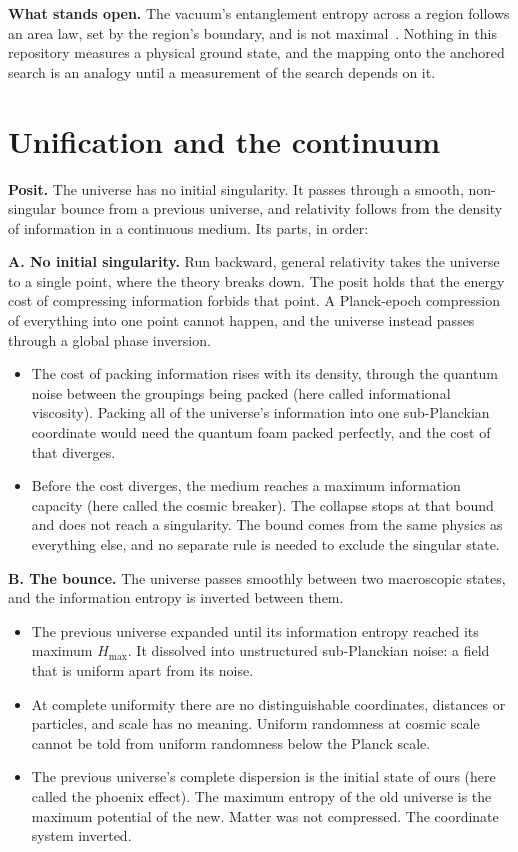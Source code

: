 \textbf{What stands open.} The vacuum's entanglement entropy across a region follows an area law, set
by the region's boundary, and is not maximal~\cite{src:Srednicki-1993}. Nothing in this repository
measures a physical ground state, and the mapping onto the anchored search is an analogy until a
measurement of the search depends on it.

\section{Unification and the continuum}

\textbf{Posit.} The universe has no initial singularity. It passes through a smooth, non-singular
bounce from a previous universe, and relativity follows from the density of information in a
continuous medium. Its parts, in order:

\textbf{A. No initial singularity.} Run backward, general relativity takes the universe to a single
point, where the theory breaks down. The posit holds that the energy cost of compressing information
forbids that point. A Planck-epoch compression of everything into one point cannot happen, and the
universe instead passes through a global phase inversion.

\begin{itemize}
\item The cost of packing information rises with its density, through the quantum noise between the
groupings being packed (here called informational viscosity). Packing all of the universe's
information into one sub-Planckian coordinate would need the quantum foam packed perfectly, and the
cost of that diverges.

\item Before the cost diverges, the medium reaches a maximum information capacity (here called the
cosmic breaker). The collapse stops at that bound and does not reach a singularity. The bound comes
from the same physics as everything else, and no separate rule is needed to exclude the singular
state.
\end{itemize}

\textbf{B. The bounce.} The universe passes smoothly between two macroscopic states, and the
information entropy is inverted between them.

\begin{itemize}
\item The previous universe expanded until its information entropy reached its maximum $H_{\max}$.
It dissolved into unstructured sub-Planckian noise: a field that is uniform apart from its noise.

\item At complete uniformity there are no distinguishable coordinates, distances or particles, and
scale has no meaning. Uniform randomness at cosmic scale cannot be told from uniform randomness below
the Planck scale.

\item The previous universe's complete dispersion is the initial state of ours (here called the
phoenix effect). The maximum entropy of the old universe is the maximum potential of the new. Matter
was not compressed. The coordinate system inverted.
\end{itemize}

